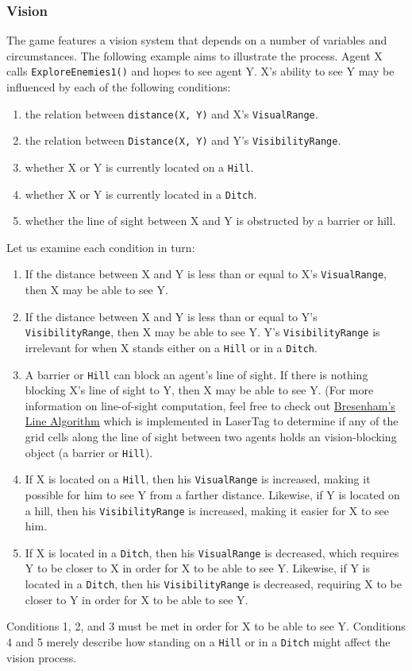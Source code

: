 \documentclass[
    a4paper,
    english,
    DIV=16,
    11pt,
    parskip=half,
    listof=totoc,		%
    index=totoc,		%
    bibliography=totoc,	%
]{scrartcl}
\begin{document}
\subsubsection{Vision} \label{vision}
The game features a vision system that depends on a number of variables and circumstances. The following example aims to illustrate the process. Agent X calls \texttt{ExploreEnemies1()} and hopes to see agent Y. X's ability to see Y may be influenced by each of the following conditions:
    \begin{enumerate}
        \item the relation between \texttt{distance(X, Y)} and X's \texttt{VisualRange}.
        \item the relation between \texttt{Distance(X, Y)} and Y's \texttt{VisibilityRange}.
        \item whether X or Y is currently located on a \texttt{Hill}.
        \item whether X or Y is currently located in a \texttt{Ditch}.
        \item whether the line of sight between X and Y is obstructed by a barrier or hill.
    \end{enumerate}
    Let us examine each condition in turn:
    \begin{enumerate}
        \item If the distance between X and Y is less than or equal to X's \texttt{VisualRange}, then X may be able to see Y.
        \item If the distance between X and Y is less than or equal to Y's \texttt{VisibilityRange}, then X may be able to see Y. Y's \texttt{VisibilityRange} is irrelevant for when X stands either on a \texttt{Hill} or in a \texttt{Ditch}.
        \item A barrier or \texttt{Hill} can block an agent's line of sight. If there is nothing blocking X's line of sight to Y, then X may be able to see Y. (For more information on line-of-sight computation, feel free to check out \href{http://tech-algorithm.com/articles/drawing-line-using-bresenham-algorithm/}{Bresenham's Line Algorithm} which is implemented in LaserTag to determine if any of the grid cells along the line of sight between two agents holds an vision-blocking object (a barrier or \texttt{Hill}).
        \item If X is located on a \texttt{Hill}, then his \texttt{VisualRange} is increased, making it possible for him to see Y from a farther distance. Likewise, if Y is located on a hill, then his \texttt{VisibilityRange} is increased, making it easier for X to see him.
        \item If X is located in a \texttt{Ditch}, then his \texttt{VisualRange} is decreased, which requires Y to be closer to X in order for X to be able to see Y. Likewise, if Y is located in a \texttt{Ditch}, then his \texttt{VisibilityRange} is decreased, requiring X to be closer to Y in order for X to be able to see Y.
    \end{enumerate}
    Conditions 1, 2, and 3 must be met in order for X to be able to see Y. Conditions 4 and 5 merely describe how standing on a \texttt{Hill} or in a \texttt{Ditch} might affect the vision process.
    
\end{document}
